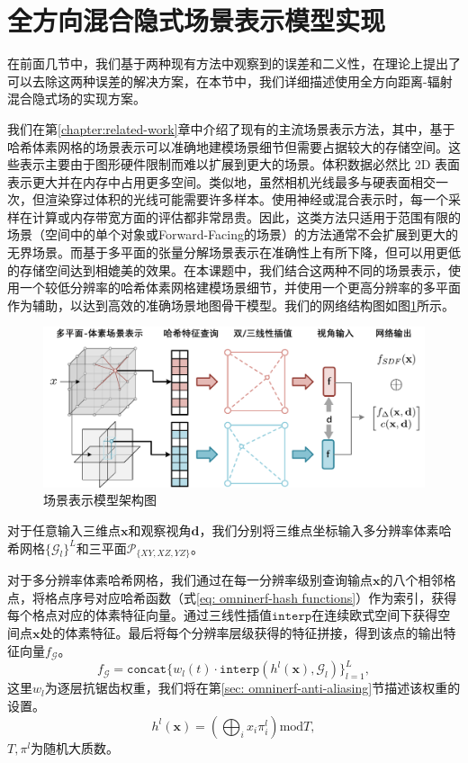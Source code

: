 \section{全方向混合隐式场景表示模型实现}
在前面几节中，我们基于两种现有方法中观察到的误差和二义性，在理论上提出了可以去除这两种误差的解决方案，在本节中，我们详细描述使用全方向距离-辐射混合隐式场的实现方案。

我们在第\ref{chapter:related-work}章中介绍了现有的主流场景表示方法，其中，基于哈希体素网格的场景表示可以准确地建模场景细节但需要占据较大的存储空间。这些表示主要由于图形硬件限制而难以扩展到更大的场景。体积数据必然比 2D 表面表示更大并在内存中占用更多空间。类似地，虽然相机光线最多与硬表面相交一次，但渲染穿过体积的光线可能需要许多样本。使用神经或混合表示时，每一个采样在计算或内存带宽方面的评估都非常昂贵。因此，这类方法只适用于范围有限的场景（空间中的单个对象或Forward-Facing的场景）的方法通常不会扩展到更大的无界场景。而基于多平面的张量分解场景表示在准确性上有所下降，但可以用更低的存储空间达到相媲美的效果。在本课题中，我们结合这两种不同的场景表示，使用一个较低分辨率的哈希体素网格建模场景细节，并使用一个更高分辨率的多平面作为辅助，以达到高效的准确场景地图骨干模型。我们的网络结构图如图\ref{fig:omninerf-scene-representation}所示。

\begin{figure}[ht]
    \centering
    \includegraphics[width=\textwidth]{undergraduate-thesis/images/omni-nerf/omninerf-scene-representation.pdf}
    \caption{场景表示模型架构图}
    \label{fig:omninerf-scene-representation}
\end{figure}

对于任意输入三维点$\mathbf{x}$和观察视角$\mathbf{d}$，我们分别将三维点坐标输入多分辨率体素哈希网格$\{\mathcal{G}_l\}^L$和三平面$\mathcal{P}_{\{XY,XZ,YZ\}}$。

对于多分辨率体素哈希网格，我们通过在每一分辨率级别查询输点$\mathbf{x}$的八个相邻格点，将格点序号对应哈希函数（式\ref{eq: omninerf-hash functions}）作为索引，获得每个格点对应的体素特征向量。通过三线性插值$\mathtt{interp}$在连续欧式空间下获得空间点$\mathbf{x}$处的体素特征。最后将每个分辨率层级获得的特征拼接，得到该点的输出特征向量$f_{\mathcal{G}}$。
\begin{equation}
    f_{\mathcal{G}} = \mathtt{concat}\{w_l(t)\cdot\mathtt{interp}(h^l(\mathbf{x}), \mathcal{G}_l)\}_{l=1}^L,
\end{equation}
这里$w_l$为逐层抗锯齿权重，我们将在第\ref{sec: omninerf-anti-aliasing}节描述该权重的设置。
\begin{equation}
    h^l(\mathbf{x}) = \left(\bigoplus_{i}x_i\pi_i^l\right) \text{mod} T,
    \label{eq: omninerf-hash functions}
\end{equation}
$T, \pi^l$为随机大质数。

